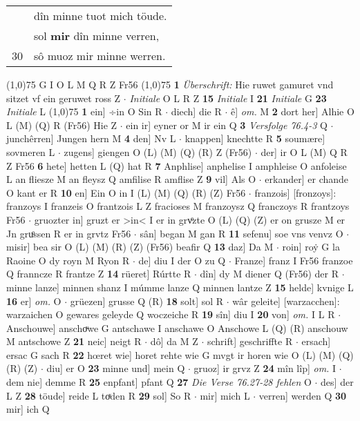 \documentclass[8pt,a4paper,notitlepage]{article}
\begin{document}
\begin{table}[ht]
\begin{minipage}[t]{0.5\linewidth}
\begin{tabular}{rl}
 & dîn minne tuot mich töude.\\ 
 & sol \textbf{mir} dîn minne verren,\\ 
30 & sô muoz mir minne werren.\\ 
\end{tabular}
\scriptsize
\line(1,0){75} \newline
G I O L M Q R Z Fr56 \newline
\line(1,0){75} \newline
\textbf{1} \textit{Überschrift:} Hie ruwet gamuret vnd sitzet vf ein geruwet ross Z   $\cdot$ \textit{Initiale} O L R Z  \textbf{15} \textit{Initiale} I  \textbf{21} \textit{Initiale} G  \textbf{23} \textit{Initiale} L  \newline
\line(1,0){75} \newline
\textbf{1} ein] ÷in O Sin R  $\cdot$ diech] die R  $\cdot$ ê] \textit{om.} M \textbf{2} dort her] Alhie O L (M) (Q) R (Fr56) Hie Z  $\cdot$ ein ir] eyner or M ir ein Q \textbf{3} \textit{Versfolge 76.4-3} Q   $\cdot$ junchêrren] Jungen hern M \textbf{4} den] Nv L  $\cdot$ knappen] knechtte R \textbf{5} soumære] sovmeren L  $\cdot$ zugens] giengen O (L) (M) (Q) (R) Z (Fr56)  $\cdot$ der] ir O L (M) Q R Z Fr56 \textbf{6} hete] hetten L (Q) hat R \textbf{7} Anphlise] anphelise I amphleise O anfoleise L an fliesze M an fleysz Q amfilise R amflise Z \textbf{9} vil] Als O  $\cdot$ erkander] er chande O kant er R \textbf{10} en] Ein O in I (L) (M) (Q) (R) (Z) Fr56  $\cdot$ franzois] [fronzoys]: franzoys I franzeis O frantzois L Z fracioses M franzoysz Q franczoys R frantzoys Fr56  $\cdot$ gruozter in] gruzt er >in< I er in grvͦzte O (L) (Q) (Z) er on grusze M er Jn gruͦssen R er in grvtz Fr56  $\cdot$ sân] began M gan R \textbf{11} sefenu] soe vns venvz O  $\cdot$ misir] bea sir O (L) (M) (R) (Z) (Fr56) beafir Q \textbf{13} daz] Da M  $\cdot$ roin] roẏ G la Raoine O dy royn M Ryon R  $\cdot$ de] diu I der O zu Q  $\cdot$ Franze] franz I Fr56 franzoe Q franncze R frantze Z \textbf{14} rüeret] Rúrtte R  $\cdot$ dîn] dy M diener Q (Fr56) der R  $\cdot$ minne lanze] minnen shanz I múmme lanze Q minnen lantze Z \textbf{15} helde] kvnige L \textbf{16} er] \textit{om.} O  $\cdot$ grüezen] grusse Q (R) \textbf{18} solt] sol R  $\cdot$ wâr geleite] [warzacchen]: warzaichen O gewares geleyde Q woczeiche R \textbf{19} sîn] diu I \textbf{20} von] \textit{om.} I L R  $\cdot$ Anschouwe] anschoͮwe G antschawe I anschawe O Anschowe L (Q) (R) anschouw M antschowe Z \textbf{21} neic] neigt R  $\cdot$ dô] da M Z  $\cdot$ schrift] geschriffte R  $\cdot$ ersach] ersac G sach R \textbf{22} hœret wie] horet rehte wie G mvgt ir horen wie O (L) (M) (Q) (R) (Z)  $\cdot$ diu] er O \textbf{23} minne und] mein Q  $\cdot$ gruoz] ir grvz Z \textbf{24} mîn lîp] \textit{om.} I  $\cdot$ dem nie] demme R \textbf{25} enpfant] pfant Q \textbf{27} \textit{Die Verse 76.27-28 fehlen} O   $\cdot$ des] der L Z \textbf{28} töude] reide L toͯden R \textbf{29} sol] So R  $\cdot$ mir] mich L  $\cdot$ verren] werden Q \textbf{30} mir] ich Q \newline

\end{minipage}
\end{table}
\end{document}
